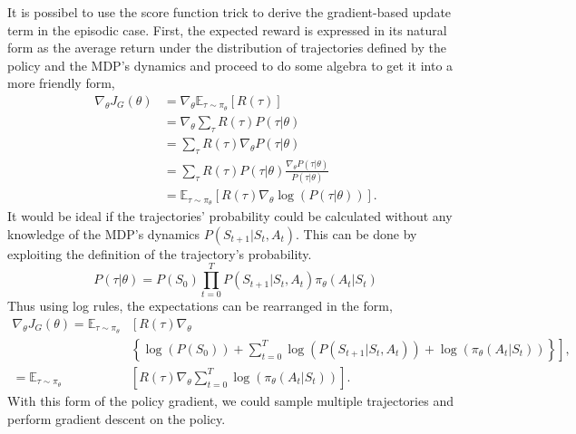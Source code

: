 It is possibel to use the score function trick to derive the gradient-based update term in the episodic case. First, the expected reward is expressed in its natural form as the average return under the distribution of trajectories defined by the policy and the MDP's dynamics and proceed to do some algebra to get it into a more friendly form,
\begin{align}
	\nabla_\theta J_G(\theta) & = \nabla_\theta \mathbb{E}_{\tau \sim \pi_\theta}\left[R(\tau)\right]                            \\
	                          & = \nabla_\theta \sum_\tau R(\tau) P(\tau|\theta)                                                 \\
	                          & = \sum_\tau R(\tau) \nabla_\theta P(\tau | \theta)                                               \\
	                          & = \sum_\tau R(\tau) P(\tau | \theta) \frac{\nabla_\theta P(\tau | \theta)}{P(\tau |\theta)}      \\
	                          & = \mathbb{E}_{\tau \sim \pi_{\theta}} \left[ R(\tau) \nabla_\theta \log(P(\tau| \theta))\right].
\end{align}
It would be ideal if the trajectories' probability could be calculated without any knowledge of the MDP's dynamics $P(S_{t+1}| S_t, A_t)$. This can be done by exploiting the definition of the trajectory's probability.
\begin{equation}
	P(\tau|\theta) = P(S_0) \prod_{t=0}^ TP(S_{t+1}| S_t, A_t)\pi_\theta(A_{t}|S_{t})
\end{equation}
Thus using log rules, the expectations can be rearranged in the form,
\begin{align}
	\nabla_\theta J_G(\theta)  = \mathbb{E}_{\tau \sim \pi_{\theta}} & \left[ R(\tau) \nabla_\theta  \right.                                                                               \\
	                                                                 & \left. \left\{ \log(P(S_0)) +  \sum_{t=0}^ T \log(P(S_{t+1}| S_t, A_t))+ \log(\pi_\theta(A_t|S_t))\right\} \right], \\
	= \mathbb{E}_{\tau \sim \pi_{\theta}}                            & \left[ R(\tau) \nabla_\theta \sum_{t=0}^ T \log(\pi_\theta(A_t|S_t))\right].
\end{align}
With this form of the policy gradient, we could sample multiple trajectories and perform gradient descent on the policy.

